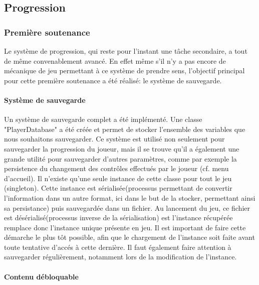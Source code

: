 \subsection{Progression}

    \vspace{0.5cm}
    \subsubsection{Première soutenance}
    \vspace{0.5cm}

        Le système de progression, qui reste pour l'instant une tâche secondaire, a tout de même convenablement avancé. En effet même s'il n'y a pas 
        encore de mécanique de jeu permettant à ce système de prendre sens, l'objectif principal pour cette première soutenance a été réalisé: le système 
        de sauvegarde.
        

        \paragraph{Système de sauvegarde}

        Un système de sauvegarde complet a été implémenté. Une classe "PlayerDatabase" a été créée et permet de stocker l'ensemble des variables que nous 
        souhaitons sauvegarder. Ce système est utilisé non seulement pour sauvegarder la progression du joueur, mais il se trouve qu'il a également une grande 
        utilité pour sauvegarder d'autres paramètres, comme par exemple la persistence du changement des contrôles effectués par le joueur (cf. menu d'accueil). 
        Il n'existe qu'une seule instance de cette classe pour tout le jeu (singleton). Cette instance est sérialisée(processus permettant de convertir 
        l'information dans un autre format, ici dans le but de la stocker, permettant ainsi sa persistance) puis sauvegardée dans un fichier. Au lancement du 
        jeu, ce fichier est désérialisé(processus inverse de la sérialisation) est l'instance récupérée remplace donc l'instance unique présente en jeu. Il est 
        important de faire cette démarche le plus tôt possible, afin que le chargement de l'instance soit faite avant toute tentative d'accés à cette dernière. 
        Il faut également faire attention à sauvegarder régulièrement, notamment lors de la modification de l'instance.


        \paragraph{Contenu débloquable}

